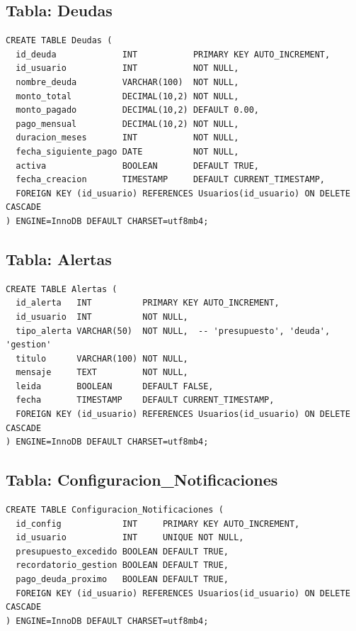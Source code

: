 \subsection{Tabla: Deudas}

\begin{lstlisting}[style=sql, caption={DDL de la tabla Deudas}]
CREATE TABLE Deudas (
  id_deuda             INT           PRIMARY KEY AUTO_INCREMENT,
  id_usuario           INT           NOT NULL,
  nombre_deuda         VARCHAR(100)  NOT NULL,
  monto_total          DECIMAL(10,2) NOT NULL,
  monto_pagado         DECIMAL(10,2) DEFAULT 0.00,
  pago_mensual         DECIMAL(10,2) NOT NULL,
  duracion_meses       INT           NOT NULL,
  fecha_siguiente_pago DATE          NOT NULL,
  activa               BOOLEAN       DEFAULT TRUE,
  fecha_creacion       TIMESTAMP     DEFAULT CURRENT_TIMESTAMP,
  FOREIGN KEY (id_usuario) REFERENCES Usuarios(id_usuario) ON DELETE CASCADE
) ENGINE=InnoDB DEFAULT CHARSET=utf8mb4;
\end{lstlisting}

\subsection{Tabla: Alertas}

\begin{lstlisting}[style=sql, caption={DDL de la tabla Alertas}]
CREATE TABLE Alertas (
  id_alerta   INT          PRIMARY KEY AUTO_INCREMENT,
  id_usuario  INT          NOT NULL,
  tipo_alerta VARCHAR(50)  NOT NULL,  -- 'presupuesto', 'deuda', 'gestion'
  titulo      VARCHAR(100) NOT NULL,
  mensaje     TEXT         NOT NULL,
  leida       BOOLEAN      DEFAULT FALSE,
  fecha       TIMESTAMP    DEFAULT CURRENT_TIMESTAMP,
  FOREIGN KEY (id_usuario) REFERENCES Usuarios(id_usuario) ON DELETE CASCADE
) ENGINE=InnoDB DEFAULT CHARSET=utf8mb4;
\end{lstlisting}

\subsection{Tabla: Configuracion\_Notificaciones}

\begin{lstlisting}[style=sql, caption={DDL de Configuracion\_Notificaciones}]
CREATE TABLE Configuracion_Notificaciones (
  id_config            INT     PRIMARY KEY AUTO_INCREMENT,
  id_usuario           INT     UNIQUE NOT NULL,
  presupuesto_excedido BOOLEAN DEFAULT TRUE,
  recordatorio_gestion BOOLEAN DEFAULT TRUE,
  pago_deuda_proximo   BOOLEAN DEFAULT TRUE,
  FOREIGN KEY (id_usuario) REFERENCES Usuarios(id_usuario) ON DELETE CASCADE
) ENGINE=InnoDB DEFAULT CHARSET=utf8mb4;
\end{lstlisting}


